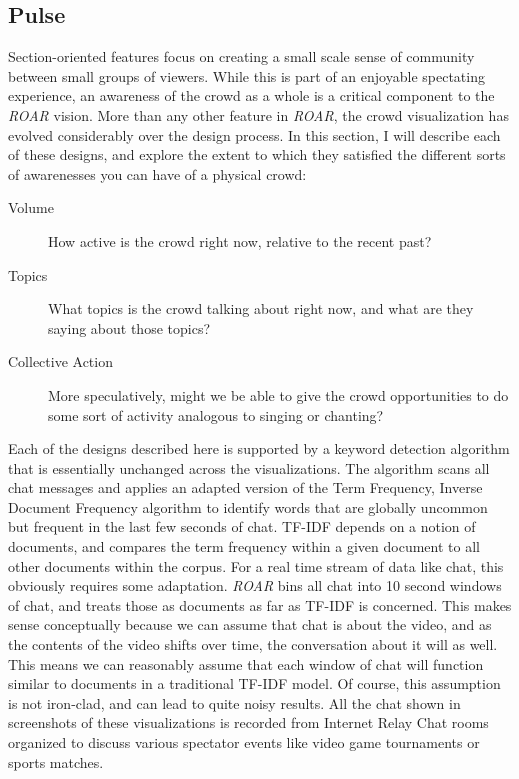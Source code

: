 \subsection{Pulse}

Section-oriented features focus on creating a small scale sense of community between small groups of viewers. While this is part of an enjoyable spectating experience, an awareness of the crowd as a whole is a critical component to the \emph{ROAR} vision. More than any other feature in \emph{ROAR}, the crowd visualization has evolved considerably over the design process. In this section, I will describe each of these designs, and explore the extent to which they satisfied the different sorts of awarenesses you can have of a physical crowd:

\begin{description}
\item [Volume]{How active is the crowd right now, relative to the recent past?}
\item [Topics]{What topics is the crowd talking about right now, and what are they saying about those topics?}
\item [Collective Action]{More speculatively, might we be able to give the crowd opportunities to do some sort of activity analogous to singing or chanting?}
\end{description}

Each of the designs described here is supported by a keyword detection algorithm that is essentially unchanged across the visualizations. The algorithm scans all chat messages and applies an adapted version of the Term Frequency, Inverse Document Frequency algorithm to identify words that are globally uncommon but frequent in the last few seconds of chat. TF-IDF depends on a notion of documents, and compares the term frequency within a given document to all other documents within the corpus. For a real time stream of data like chat, this obviously requires some adaptation. \emph{ROAR} bins all chat into 10 second windows of chat, and treats those as documents as far as TF-IDF is concerned. This makes sense conceptually because we can assume that chat is about the video, and as the contents of the video shifts over time, the conversation about it will as well. This means we can reasonably assume that each window of chat will function similar to documents in a traditional TF-IDF model. Of course, this assumption is not iron-clad, and can lead to quite noisy results. All the chat shown in screenshots of these visualizations is recorded from Internet Relay Chat rooms organized to discuss various spectator events like video game tournaments or sports matches. 

